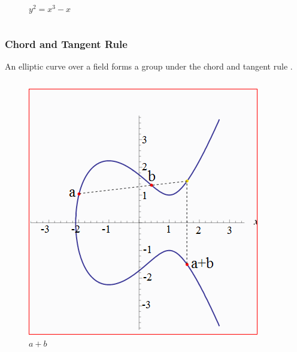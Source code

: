 \documentclass[xcolor=pdftex,dvipsnames,table]{beamer}
\theoremstyle{plain}
\theoremstyle{definition}
\begin{document}
\begin{frame}
\begin{columns}
\begin{figure}
		\caption{$y^2=x^3-x$}
	\end{figure}
	\end{columns}
\end{frame}

\begin{frame}
	\frametitle{Chord and Tangent Rule}
	
	An elliptic curve over a field forms a group under the chord and tangent rule \cite{Galbraith}.
	\begin{columns}
	\begin{figure}
		\centering
		\includegraphics[scale=.2]{p_plus_q.png}
		\caption{$a+b$}
	\end{figure}
	

\end{columns}
\end{frame}
\end{document}
